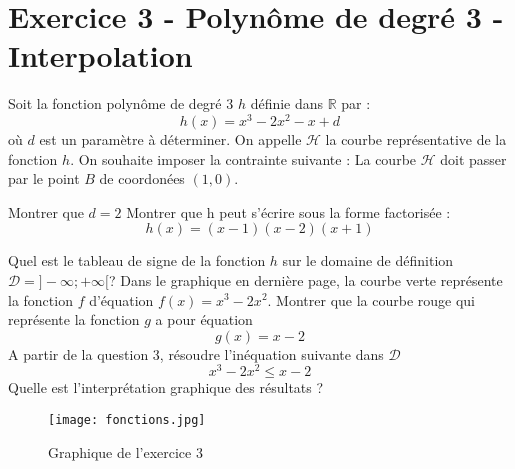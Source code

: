 \documentclass{exam}
\begin{document}
\section*{Exercice 3 - Polynôme de degré 3 - Interpolation}


Soit la fonction polynôme de degré 3 $h$ définie dans $\mathbb{R}$ par :
\[
h(x) = x^3 - 2x^2 -x + d
\]
où $d$ est un paramètre à déterminer. On appelle $\mathcal{H}$ la courbe représentative de la fonction $h$. On souhaite imposer la contrainte suivante : La courbe \(\mathcal{H}\) doit passer par le point $B$ de coordonées $(1, 0)$.

\begin{questions}

\question[1] Montrer que $d = 2$
\question[1] Montrer que h peut s'écrire sous la forme factorisée : 
\[
  h(x) = (x-1)(x-2)(x+1)
\]

\question[1] Quel est le tableau de signe de la fonction $h$ sur le domaine de définition $\mathcal{D} = ] - \infty ; + \infty [$?
\question[1] Dans le graphique en dernière page, la courbe verte représente la fonction $f$ d'équation $f(x) = x^3 - 2x^2$. Montrer que la courbe rouge qui représente la fonction $g$ a pour équation 
\[
g(x) = x - 2
\]
\question[1] A partir de la question 3, résoudre l'inéquation suivante dans $\mathcal{D}$
\[
x^3 - 2x^2 \leq x - 2
\]
Quelle est l'interprétation graphique des résultats ?

\end{questions}

\begin{figure}[H]
  \centering
  \texttt{[image: fonctions.jpg]}
  \caption{\label{} Graphique de l'exercice 3}
\end{figure}
\end{document}
